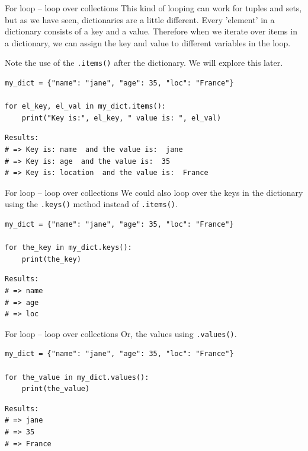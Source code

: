 \documentclass[10pt]{beamer}
\begin{document}
\begin{frame}[label={sec:orga7795a2},fragile]{For loop -- loop over collections}
 This kind of looping can work for tuples and sets, but as we have seen, dictionaries
are a little different. Every 'element' in a dictionary consists of a key and a
value. Therefore when we iterate over items in a dictionary, we can assign the key
and value to different variables in the loop.

\alert{Note} the use of the \texttt{.items()} after the dictionary. We will explore this later.

\begin{verbatim}
my_dict = {"name": "jane", "age": 35, "loc": "France"}

for el_key, el_val in my_dict.items():
    print("Key is:", el_key, " value is: ", el_val)
\end{verbatim}

\begin{verbatim}
Results: 
# => Key is: name  and the value is:  jane
# => Key is: age  and the value is:  35
# => Key is: location  and the value is:  France
\end{verbatim}
\end{frame}


\begin{frame}[label={sec:org772d676},fragile]{For loop -- loop over collections}
 We could also loop over the keys in the dictionary using the \texttt{.keys()} method instead
of \texttt{.items()}.

\begin{verbatim}
my_dict = {"name": "jane", "age": 35, "loc": "France"}

for the_key in my_dict.keys():
    print(the_key)
\end{verbatim}

\begin{verbatim}
Results: 
# => name
# => age
# => loc
\end{verbatim}
\end{frame}

\begin{frame}[label={sec:orga42526d},fragile]{For loop -- loop over collections}
 Or, the values using \texttt{.values()}.

\begin{verbatim}
my_dict = {"name": "jane", "age": 35, "loc": "France"}

for the_value in my_dict.values():
    print(the_value)
\end{verbatim}

\begin{verbatim}
Results: 
# => jane
# => 35
# => France
\end{verbatim}
\end{frame}
\end{document}
